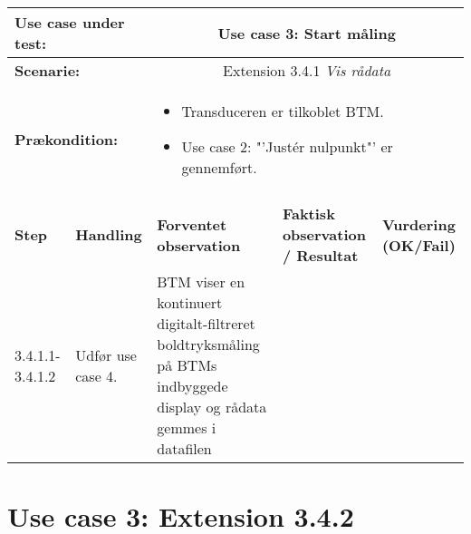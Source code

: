 \begin{tabular}{|p{1cm}|p{3cm}|p{4cm}|p{4cm}|p{2cm}|}
\hline
\multicolumn{2}{|p{3cm}|}{\textbf{Use case under test:}} & \multicolumn{3}{c|}{Use case 3: Start måling} \\\hline

\multicolumn{2}{|p{3cm}|}{\textbf{Scenarie:}} & \multicolumn{3}{c|}{Extension 3.4.1 \textit{Vis rådata}} \\\hline

\multicolumn{2}{|p{3cm}|}{\textbf{Prækondition:}}  & \multicolumn{3}{l|}{\parbox{0.6\textwidth}{
\begin{itemize}[label=$\circ$]
\item Transduceren er tilkoblet BTM.
\item Use case 2: "'Justér nulpunkt"' er gennemført.  
\end{itemize} }}\\\hline

\multicolumn{5}{|c|}{} \\\hline

\textbf{Step} & \textbf{Handling} & \textbf{Forventet observation} & \textbf{Faktisk observation / Resultat} & \textbf{Vurdering (OK/Fail)}\\\hline

3.4.1.1-3.4.1.2 & Udfør use case 4. & BTM viser en kontinuert digitalt-filtreret boldtryksmåling på BTMs indbyggede display og rådata gemmes i datafilen &  & \\\hline

\end{tabular}

\newpage

\section{Use case 3: Extension 3.4.2}

